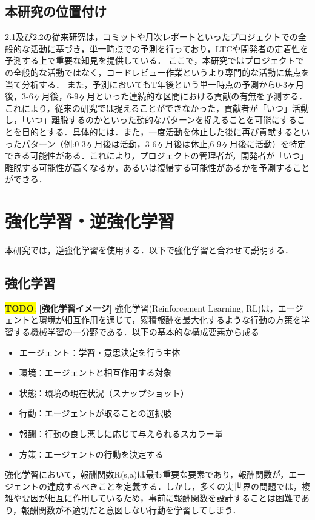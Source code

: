 \documentclass[submit,techrep,noauthor]{ipsj}
\newcommand{\todo}[1]{\colorbox{yellow}{{\bf TODO}:}{\color{red} {\textbf{[#1]}}}}
\begin{document}
\subsection{本研究の位置付け}
2.1及び2.2の従来研究は，コミットや月次レポートといったプロジェクトでの全般的な活動に基づき，単一時点での予測を行っており，LTCや開発者の定着性を予測する上で重要な知見を提供している．
ここで，本研究ではプロジェクトでの全般的な活動ではなく，コードレビュー作業というより専門的な活動に焦点を当て分析する．
また，予測においてもT年後という単一時点の予測から0-3ヶ月後，3-6ヶ月後，6-9ヶ月といった連続的な区間における貢献の有無を予測する．これにより，従来の研究では捉えることができなかった，貢献者が「いつ」活動し，「いつ」離脱するのかといった動的なパターンを捉えることを可能にすることを目的とする．具体的には．また，一度活動を休止した後に再び貢献するといったパターン（例:0-3ヶ月後は活動，3-6ヶ月後は休止,6-9ヶ月後に活動）を特定できる可能性がある．これにより，プロジェクトの管理者が，開発者が「いつ」離脱する可能性が高くなるか，あるいは復帰する可能性があるかを予測することができる．


\label{sec:format}




\label{config}
\section{強化学習・逆強化学習}
本研究では，逆強化学習を使用する．以下で強化学習と合わせて説明する．
\subsection{強化学習}
\todo{強化学習イメージ}
強化学習(Reinforcement Learning, RL)は，エージェントと環境が相互作用を通じて，累積報酬を最大化するような行動の方策を学習する機械学習の一分野である．以下の基本的な構成要素から成る
\begin{itemize}
    \item エージェント：学習・意思決定を行う主体
    \item 環境：エージェントと相互作用する対象
    \item 状態：環境の現在状況（スナップショット）
    \item 行動：エージェントが取ることの選択肢
    \item 報酬：行動の良し悪しに応じて与えられるスカラー量
    \item 方策：エージェントの行動を決定する
\end{itemize}
強化学習において，報酬関数R(s,a)は最も重要な要素であり，報酬関数が，エージェントの達成するべきことを定義する．しかし，多くの実世界の問題では，複雑や要因が相互に作用しているため，事前に報酬関数を設計することは困難であり，報酬関数が不適切だと意図しない行動を学習してしまう．
\end{document}
